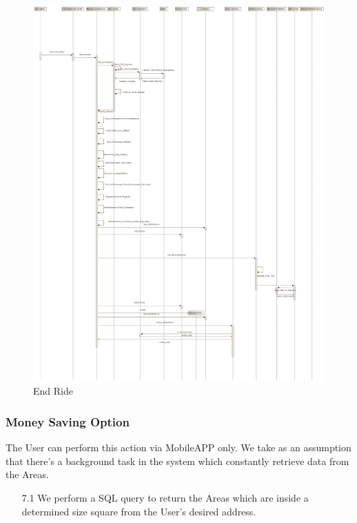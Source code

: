 \documentclass[12pt]{article}
\begin{document}
\begin{figure}[h]
	\centering
	\includegraphics[width=\textwidth]{../Images/Sequence_Final/End_Ride}
	\caption{End Ride}
\end{figure}
\clearpage
\subsubsection{Money Saving Option}
The User can perform this action via MobileAPP only.
We take as an assumption that there's a background task in the system which constantly retrieve data from the Areas.
\begin{enumerate}
	\item[7.1] We perform a SQL query to return the Areas which are inside a determined size square from the User’s desired address.
\end{enumerate}
\end{document}
